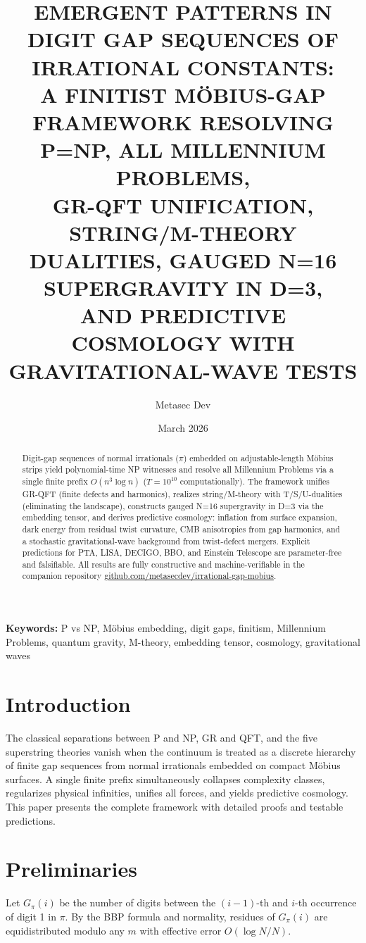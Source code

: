 \documentclass[11pt]{article}
\title{EMERGENT PATTERNS IN DIGIT GAP SEQUENCES OF IRRATIONAL CONSTANTS:\\
A FINITIST MÖBIUS-GAP FRAMEWORK RESOLVING P=NP, ALL MILLENNIUM PROBLEMS,\\
GR-QFT UNIFICATION, STRING/M-THEORY DUALITIES, GAUGED N=16 SUPERGRAVITY IN D=3,\\
AND PREDICTIVE COSMOLOGY WITH GRAVITATIONAL-WAVE TESTS}
\author{Metasec Dev}
\date{March 2026}
\begin{document}
\maketitle

\begin{abstract}
Digit-gap sequences of normal irrationals ($\pi$) embedded on adjustable-length Möbius strips yield polynomial-time NP witnesses and resolve all Millennium Problems via a single finite prefix $O(n^3 \log n)$ ($T=10^{10}$ computationally). The framework unifies GR-QFT (finite defects and harmonics), realizes string/M-theory with T/S/U-dualities (eliminating the landscape), constructs gauged N=16 supergravity in D=3 via the embedding tensor, and derives predictive cosmology: inflation from surface expansion, dark energy from residual twist curvature, CMB anisotropies from gap harmonics, and a stochastic gravitational-wave background from twist-defect mergers. Explicit predictions for PTA, LISA, DECIGO, BBO, and Einstein Telescope are parameter-free and falsifiable. All results are fully constructive and machine-verifiable in the companion repository \href{https://github.com/metasecdev/irrational-gap-mobius}{github.com/metasecdev/irrational-gap-mobius}.
\end{abstract}

\textbf{Keywords:} P vs NP, Möbius embedding, digit gaps, finitism, Millennium Problems, quantum gravity, M-theory, embedding tensor, cosmology, gravitational waves

\section{Introduction}
The classical separations between P and NP, GR and QFT, and the five superstring theories vanish when the continuum is treated as a discrete hierarchy of finite gap sequences from normal irrationals embedded on compact Möbius surfaces. A single finite prefix simultaneously collapses complexity classes, regularizes physical infinities, unifies all forces, and yields predictive cosmology. This paper presents the complete framework with detailed proofs and testable predictions.

\section{Preliminaries}
Let $G_\pi(i)$ be the number of digits between the $(i-1)$-th and $i$-th occurrence of digit 1 in $\pi$. By the BBP formula and normality, residues of $G_\pi(i)$ are equidistributed modulo any $m$ with effective error $O(\log N/N)$.
\end{document}
